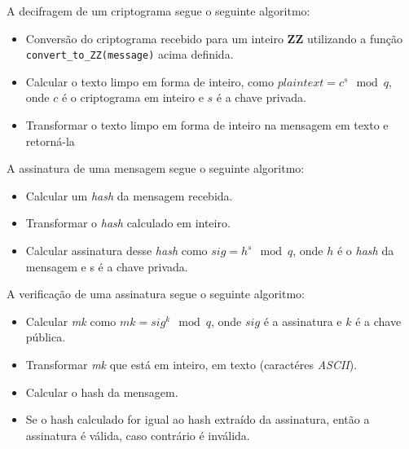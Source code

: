 \documentclass[11pt]{article}
\providecommand{\tightlist}{%
      \setlength{\itemsep}{0pt}\setlength{\parskip}{0pt}}
\begin{document}
A decifragem de um criptograma segue o seguinte algoritmo:

\begin{itemize}
\tightlist
\item
  Conversão do criptograma recebido para um inteiro \textbf{ZZ}
  utilizando a função \texttt{convert\_to\_ZZ(message)} acima definida.
\item
  Calcular o texto limpo em forma de inteiro, como $ plaintext = c^{s}
  \mod q $, onde $c$ é o criptograma em inteiro e $s$ é a chave privada.
\item
  Transformar o texto limpo em forma de inteiro na mensagem em texto e
  retorná-la
\end{itemize}

A assinatura de uma mensagem segue o seguinte algoritmo:

\begin{itemize}
\tightlist
\item
  Calcular um \emph{hash} da mensagem recebida.
\item
  Transformar o \emph{hash} calculado em inteiro.
\item
  Calcular assinatura desse \emph{hash} como $ sig = h^{s} \mod q $,
  onde $h$ é o \emph{hash} da mensagem e s $é$ a chave privada.
\end{itemize}

A verificação de uma assinatura segue o seguinte algoritmo:

\begin{itemize}
\tightlist
\item
  Calcular \emph{mk} como $ mk = sig^{k} \mod q $, onde $sig$ é a
  assinatura e $k$ é a chave pública.
\item
  Transformar \emph{mk} que está em inteiro, em texto (caractéres
  \emph{ASCII}).
\item
  Calcular o hash da mensagem.
\item
  Se o hash calculado for igual ao hash extraído da assinatura, então a
  assinatura é válida, caso contrário é inválida.
\end{itemize}
\end{document}
